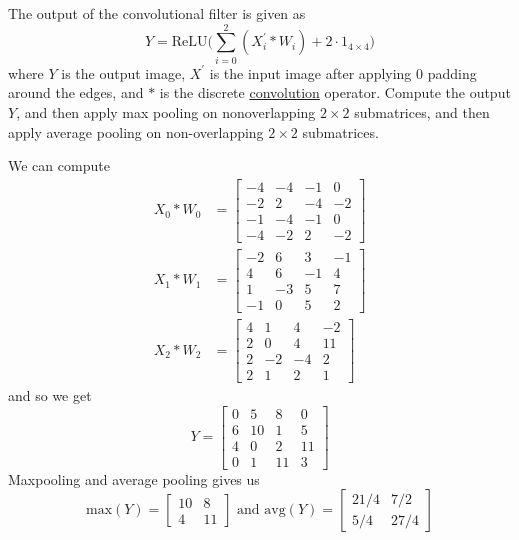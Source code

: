 \begin{example}
    The output of the convolutional filter is given as 
    \begin{equation}
      Y = \mathrm{ReLU} \bigg( \sum_{i=0}^2 (X_i^\prime \ast W_i) + 2 \cdot 1_{4 \times 4}\bigg)
    \end{equation}
    where $Y$ is the output image, $X^\prime$ is the input image after applying $0$ padding around the edges, and $\ast$ is the discrete \hyperref[prob-def:convolution]{convolution} operator. Compute the output $Y$, and then apply max pooling on nonoverlapping $2 \times 2$ submatrices, and then apply average pooling on non-overlapping $2 \times 2$ submatrices. 
  \end{example}
  \begin{solution}
    We can compute 
    \begin{align*} 
      X_0 \ast  W_0 & = \begin{bmatrix} -4 & -4 & -1 & 0 \\ -2 & 2 & -4 & -2 \\ -1 & -4 & -1 & 0 \\ -4 & -2 & 2 & -2 \end{bmatrix} \\
      X_1 \ast W_1 & = \begin{bmatrix} -2 & 6 & 3 & -1 \\ 4 & 6 & -1 & 4 \\ 1 & -3 & 5 & 7 \\ -1 & 0 & 5 & 2 \end{bmatrix} \\
      X_2 \ast W_2 & = \begin{bmatrix} 4 & 1 & 4 & -2 \\ 2 & 0 & 4 & 11 \\ 2 & -2 & -4 & 2 \\ 2 & 1 & 2 & 1 \end{bmatrix}
    \end{align*}
    and so we get 
    \begin{equation}
      Y = \begin{bmatrix} 0 & 5 & 8 & 0 \\ 6 & 10 & 1 & 5 \\ 4 &  0 & 2 & 11 \\ 0 & 1 & 11 & 3 \end{bmatrix}
    \end{equation}
    Maxpooling and average pooling gives us 
    \begin{equation}
      \mathrm{max}(Y) = \begin{bmatrix} 10 & 8 \\ 4 & 11 \end{bmatrix} \text{ and } \mathrm{avg}(Y) = \begin{bmatrix} 21/4 & 7/2 \\ 5/4 & 27/4 \end{bmatrix}
    \end{equation}
  \end{solution}

